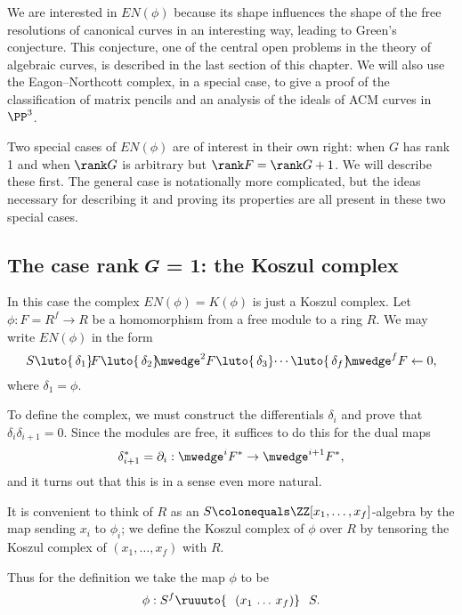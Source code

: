 We
are interested in $EN(\phi)$ because its shape
influences the shape of the free resolutions of canonical curves in an
interesting way,
leading to Green's conjecture. This conjecture, one of the central open
problems in the theory of algebraic curves, is described in the last
section of this chapter. We will also use the Eagon--Northcott
complex, in a special case, to give a proof of the classification of
matrix pencils and an analysis of the ideals of ACM curves in $\PP^{3}$.

Two special cases of $EN(\phi)$ are of interest in their own right: when
$G$ has rank 1 and when
$\rank G$ is arbitrary but $\rank F = \rank G + 1$.
We
will describe these first. The general case
is notationally more complicated, but the  ideas necessary for
describing it and proving its properties
 are all
present in these two special cases.


\subsection*{The case rank\,{\itshape G} = 1: the Koszul complex}

In this case the complex $EN(\phi) = K(\phi)$ is just a
 Koszul complex. Let $\phi:F = R^{f}\to R$ be a homomorphism from
a free module to a ring $R$. We may write $EN(\phi)$ in the form
$$
S \luto{\,\delta_{1}} \!F \luto{\,\delta_{2}}\!\! \mwedge^{2}F
\luto{\,\delta_{3}} \!\cdots \luto{\,\delta_{f}}\!\!\mwedge^{f}F\leftarrow 0, 
$$
where $\delta_{1} = \phi$.

To define the complex, we must construct the differentials $\delta_{i}$
and prove that
$\delta_{i}\delta_{i+1} = 0$. Since the modules are free, it suffices
to do this for the
dual maps
$$
\delta_{i+1}^* = \partial_{i}: \mwedge^{i}F^{*} \to \mwedge^{i+1}F^{*},
$$
and it turns out that this is in a sense even more natural.

It is convenient to think of $R$ as an $S \colonequals  \ZZ[x_{1},\dots,
x_{f}]$-algebra by the map sending
$x_{i}$ to $\phi_{i}$; we  define the Koszul complex of $\phi$ over $R$
%
by tensoring
the Koszul complex of $(x_{1}, \dots, x_{f})$ with $R$.

Thus for the definition we take the map $\phi$ to be
$$
\phi: S^{f}\ruuuto {\ \
(x_{1} \,\dots \, x_{f})
} \hskip0.7em S.
$$

